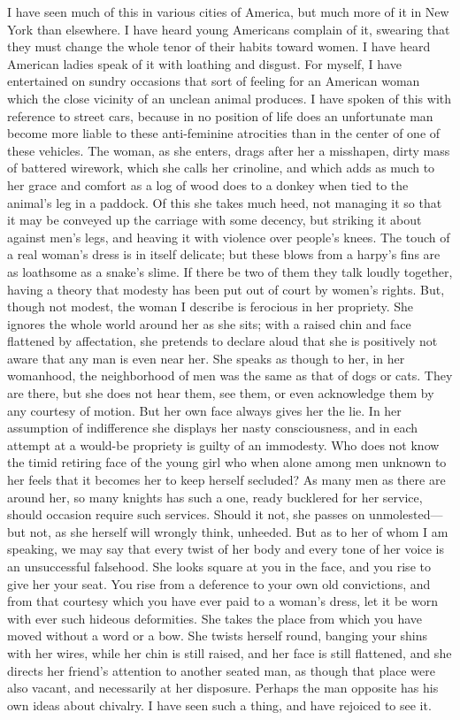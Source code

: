 I have seen much of this in various cities of America, but much
more of it in New York than elsewhere.  I have heard young
Americans complain of it, swearing that they must change the whole
tenor of their habits toward women.  I have heard American ladies
speak of it with loathing and disgust.  For myself, I have
entertained on sundry occasions that sort of feeling for an
American woman which the close vicinity of an unclean animal
produces.  I have spoken of this with reference to street cars,
because in no position of life does an unfortunate man become more
liable to these anti-feminine atrocities than in the center of one
of these vehicles.  The woman, as she enters, drags after her a
misshapen, dirty mass of battered wirework, which she calls her
crinoline, and which adds as much to her grace and comfort as a log
of wood does to a donkey when tied to the animal's leg in a
paddock.  Of this she takes much heed, not managing it so that it
may be conveyed up the carriage with some decency, but striking it
about against men's legs, and heaving it with violence over
people's knees.  The touch of a real woman's dress is in itself
delicate; but these blows from a harpy's fins are as loathsome as a
snake's slime.  If there be two of them they talk loudly together,
having a theory that modesty has been put out of court by women's
rights.  But, though not modest, the woman I describe is ferocious
in her propriety.  She ignores the whole world around her as she
sits; with a raised chin and face flattened by affectation, she
pretends to declare aloud that she is positively not aware that any
man is even near her.  She speaks as though to her, in her
womanhood, the neighborhood of men was the same as that of dogs or
cats.  They are there, but she does not hear them, see them, or
even acknowledge them by any courtesy of motion.  But her own face
always gives her the lie.  In her assumption of indifference she
displays her nasty consciousness, and in each attempt at a would-be
propriety is guilty of an immodesty.  Who does not know the timid
retiring face of the young girl who when alone among men unknown to
her feels that it becomes her to keep herself secluded?  As many
men as there are around her, so many knights has such a one, ready
bucklered for her service, should occasion require such services.
Should it not, she passes on unmolested---but not, as she herself
will wrongly think, unheeded.  But as to her of whom I am speaking,
we may say that every twist of her body and every tone of her voice
is an unsuccessful falsehood.  She looks square at you in the face,
and you rise to give her your seat.  You rise from a deference to
your own old convictions, and from that courtesy which you have
ever paid to a woman's dress, let it be worn with ever such hideous
deformities.  She takes the place from which you have moved without
a word or a bow.  She twists herself round, banging your shins with
her wires, while her chin is still raised, and her face is still
flattened, and she directs her friend's attention to another seated
man, as though that place were also vacant, and necessarily at her
disposure.  Perhaps the man opposite has his own ideas about
chivalry.  I have seen such a thing, and have rejoiced to see it.

